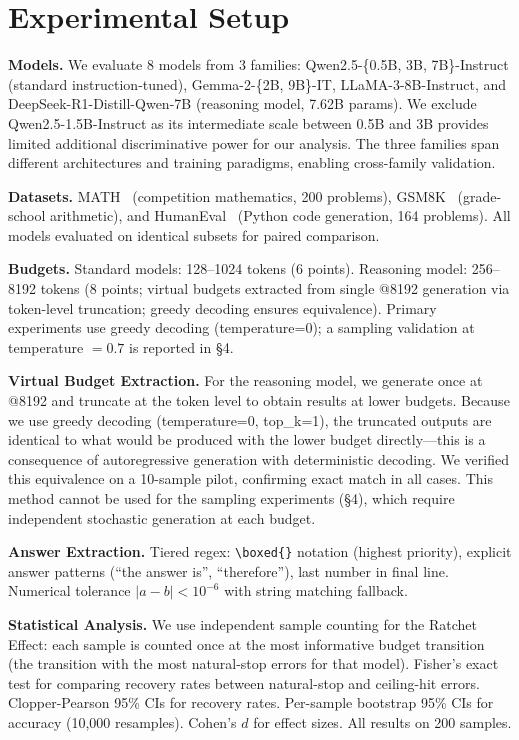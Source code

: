 \documentclass{article}
\begin{document}
\section{Experimental Setup}

\textbf{Models.}
We evaluate 8 models from 3 families: Qwen2.5-\{0.5B, 3B, 7B\}-Instruct (standard instruction-tuned), Gemma-2-\{2B, 9B\}-IT, LLaMA-3-8B-Instruct, and DeepSeek-R1-Distill-Qwen-7B (reasoning model, 7.62B params). We exclude Qwen2.5-1.5B-Instruct as its intermediate scale between 0.5B and 3B provides limited additional discriminative power for our analysis. The three families span different architectures and training paradigms, enabling cross-family validation.

\textbf{Datasets.}
MATH~\cite{hendrycks2021math} (competition mathematics, 200 problems), GSM8K~\cite{cobbe2021gsm8k} (grade-school arithmetic), and HumanEval~\cite{humaneval2021} (Python code generation, 164 problems). All models evaluated on identical subsets for paired comparison.

\textbf{Budgets.}
Standard models: 128--1024 tokens (6 points). Reasoning model: 256--8192 tokens (8 points; virtual budgets extracted from single @8192 generation via token-level truncation; greedy decoding ensures equivalence). Primary experiments use greedy decoding (temperature=0); a sampling validation at temperature $= 0.7$ is reported in \S4.

\textbf{Virtual Budget Extraction.}
For the reasoning model, we generate once at @8192 and truncate at the token level to obtain results at lower budgets. Because we use greedy decoding (temperature=0, top\_k=1), the truncated outputs are identical to what would be produced with the lower budget directly---this is a consequence of autoregressive generation with deterministic decoding. We verified this equivalence on a 10-sample pilot, confirming exact match in all cases. This method cannot be used for the sampling experiments (\S4), which require independent stochastic generation at each budget.

\textbf{Answer Extraction.}
Tiered regex: \texttt{\textbackslash boxed\{\}} notation (highest priority), explicit answer patterns (``the answer is'', ``therefore''), last number in final line. Numerical tolerance $|a-b| < 10^{-6}$ with string matching fallback.

\textbf{Statistical Analysis.}
We use independent sample counting for the Ratchet Effect: each sample is counted once at the most informative budget transition (the transition with the most natural-stop errors for that model). Fisher's exact test for comparing recovery rates between natural-stop and ceiling-hit errors. Clopper-Pearson 95\% CIs for recovery rates. Per-sample bootstrap 95\% CIs for accuracy (10,000 resamples). Cohen's $d$ for effect sizes. All results on 200 samples.
\end{document}
